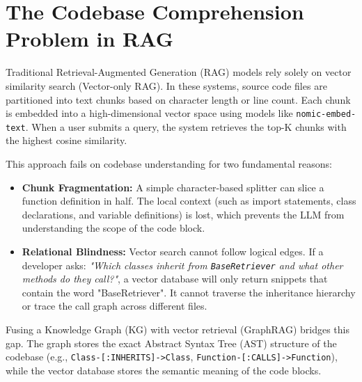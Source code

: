 \documentclass[12pt,a4paper,oneside]{report}
\begin{document}
\section{The Codebase Comprehension Problem in RAG}
Traditional Retrieval-Augmented Generation (RAG) models rely solely on vector similarity search (Vector-only RAG). In these systems, source code files are partitioned into text chunks based on character length or line count. Each chunk is embedded into a high-dimensional vector space using models like \texttt{nomic-embed-text}. When a user submits a query, the system retrieves the top-K chunks with the highest cosine similarity.

This approach fails on codebase understanding for two fundamental reasons:
\begin{itemize}
    \item \textbf{Chunk Fragmentation:} A simple character-based splitter can slice a function definition in half. The local context (such as import statements, class declarations, and variable definitions) is lost, which prevents the LLM from understanding the scope of the code block.
    \item \textbf{Relational Blindness:} Vector search cannot follow logical edges. If a developer asks: \textit{"Which classes inherit from \texttt{BaseRetriever} and what other methods do they call?"}, a vector database will only return snippets that contain the word "BaseRetriever". It cannot traverse the inheritance hierarchy or trace the call graph across different files.
\end{itemize}

Fusing a Knowledge Graph (KG) with vector retrieval (GraphRAG) bridges this gap. The graph stores the exact Abstract Syntax Tree (AST) structure of the codebase (e.g., \texttt{Class-[:INHERITS]->Class}, \texttt{Function-[:CALLS]->Function}), while the vector database stores the semantic meaning of the code blocks.
\end{document}
